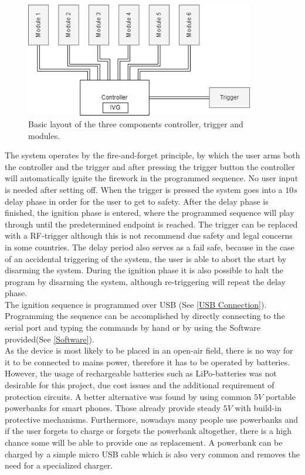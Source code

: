 \begin{figure}[!ht]
    \centering
    \includegraphics[width=10cm]{./Figures/concept_all.png}
    \caption{Basic layout of the three components controller, trigger and modules.}
    \label{fig:concept}     
\end{figure}

\noindent The system operates by the fire-and-forget principle, by which the user arms both the controller and the trigger and after pressing the trigger button the controller will automatically ignite the firework in the programmed sequence. No user input is needed after setting off. When the trigger is pressed the system goes into a $10s$ delay phase in order for the user to get to safety. After the delay phase is finished, the ignition phase is entered, where the programmed sequence will play through until the predetermined endpoint is reached. The trigger can be replaced with a RF-trigger although this is not recommend due safety and legal concerns in some countries. The delay period also serves as a fail safe, because in the case of an accidental triggering of the system, the user is able to abort the start by disarming the system. During the ignition phase it is also possible to halt the program by disarming the system, although re-triggering will repeat the delay phase.\\

\noindent The ignition sequence is programmed over USB (See \cref{USB Connection}). Programming the sequence can be accomplished by directly connecting to the serial port and typing the commands by hand or by using the Software provided(See \cref{Software}).\\

\noindent As the device is most likely to be placed in an open-air field, there is no way for it to be connected to mains power, therefore it has to be operated by batteries. However, the usage of rechargeable batteries such as LiPo-batteries was not desirable for this project, due cost issues and the additional requirement of protection circuits. A better alternative was found by using common $5V$ portable powerbanks for smart phones. Those already provide steady $5V$ with build-in protective mechanisms. Furthermore, nowadays many people use powerbanks and if the user forgets to charge or forgets the powerbank altogether, there is a high chance some will be able to provide one as replacement. A powerbank can be charged by a simple micro USB cable which is also very common and removes the need for a specialized charger.





